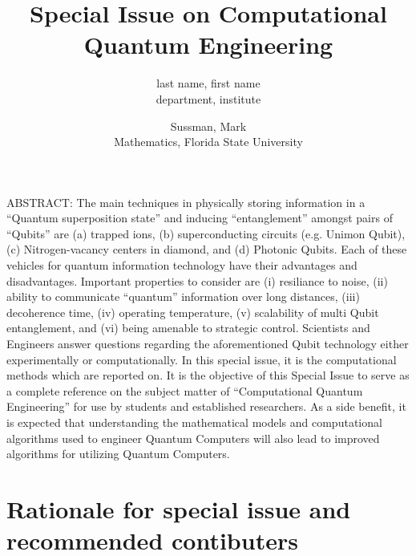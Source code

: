 \documentclass[]{article}
\title{Special Issue on Computational Quantum Engineering}
\author{
  last name, first name \\
  department, institute
  \and
  Sussman, Mark \\
  Mathematics, Florida State University
}
\begin{document}
\maketitle

ABSTRACT:
The main techniques in physically storing information in a ``Quantum superposition state'' and inducing ``entanglement'' amongst pairs of ``Qubits'' are (a) trapped ions, (b) superconducting circuits (e.g. Unimon Qubit), (c) Nitrogen-vacancy centers in diamond, and (d) Photonic Qubits.  Each of these vehicles for quantum information technology have their advantages and disadvantages.  Important properties to consider are (i) resiliance to noise, (ii) ability to communicate ``quantum'' information over long distances, (iii) decoherence time, (iv) operating temperature, (v) scalability of multi Qubit entanglement, and (vi) being amenable to strategic control.  Scientists and Engineers answer questions regarding the aforementioned Qubit technology either experimentally or computationally.  In this special issue, it is the computational methods which are reported on.  It is the objective of this Special Issue to serve as a complete reference on the subject matter of ``Computational Quantum Engineering'' for use by students and established researchers.  As a side benefit, it is expected that understanding the mathematical models and computational algorithms used to engineer Quantum Computers will also lead to improved algorithms for utilizing Quantum Computers.

\section{Rationale for special issue and recommended contibuters}

\begin{comment}

\cite{BLATT1967382}
``Practical points concerning the solution of the Schrödinger equation''
\cite{FEIT1982412}
``Solution of the Schrödinger equation by a spectral method''
\cite{https://doi.org/10.1002/andp.19273892002}
``Zur Quantentheorie der Molekeln''
\cite{wang2020localization}
``Localization and delocalization of light in photonic moir{\'e} lattices''
``Approximating spectral densities of large matrices''
\cite{ramkarthik2021numerical}
``Numerical recipes in quantum information theory and quantum computing: an adventure in FORTRAN 90''
\cite{yeomans1988theory}
``The theory and application of axial Ising models''
\cite{milburn2000ion}
``Ion trap quantum computing with warm ions''

\cite{shastri2021photonics}
``Photonics for artificial intelligence and neuromorphic computing''

\cite{wanjura2024fully}
``Fully nonlinear neuromorphic computing with linear wave scattering''
\cite{de2024spin}
``A spin-optical quantum computing architecture''
\cite{heurtel2023perceval}
``Perceval: A software platform for discrete variable photonic quantum computing''
\cite{wiebe2014quantum}
``Quantum deep learning''

\end{comment}
\end{document}
